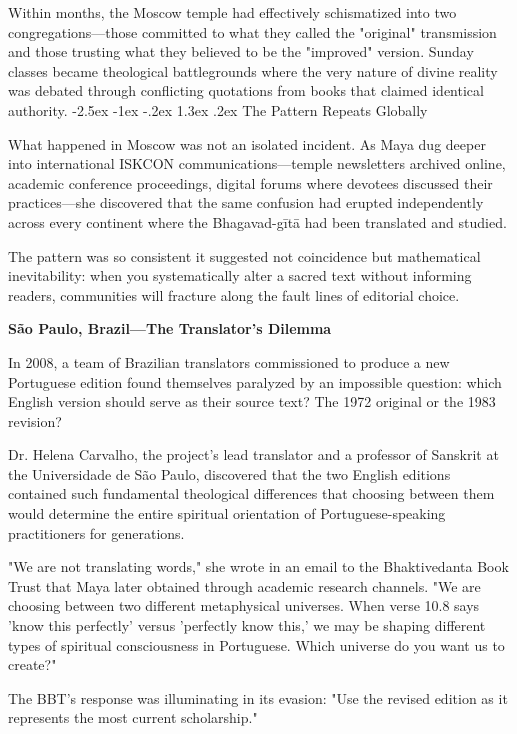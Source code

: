 \documentclass[12pt,twoside]{book}
\makeatletter
\renewcommand\section{\@startsection{section}{1}{\z@}%
{-2.5ex \@plus -1ex \@minus -.2ex}%
{1.3ex \@plus.2ex}%
{\normalfont\Large\bfseries}}
\makeatother
\begin{document}
Within months, the Moscow temple had effectively schismatized into two congregations—those committed to what they called the "original" transmission and those trusting what they believed to be the "improved" version. Sunday classes became theological battlegrounds where the very nature of divine reality was debated through conflicting quotations from books that claimed identical authority.
\section{The Pattern Repeats Globally}
\label{sec:orga15c1b7}

What happened in Moscow was not an isolated incident. As Maya dug deeper into international ISKCON communications—temple newsletters archived online, academic conference proceedings, digital forums where devotees discussed their practices—she discovered that the same confusion had erupted independently across every continent where the Bhagavad-gītā had been translated and studied.

The pattern was so consistent it suggested not coincidence but mathematical inevitability: when you systematically alter a sacred text without informing readers, communities will fracture along the fault lines of editorial choice.

\textbf{\textbf{São Paulo, Brazil—The Translator's Dilemma}}

In 2008, a team of Brazilian translators commissioned to produce a new Portuguese edition found themselves paralyzed by an impossible question: which English version should serve as their source text? The 1972 original or the 1983 revision?

Dr. Helena Carvalho, the project's lead translator and a professor of Sanskrit at the Universidade de São Paulo, discovered that the two English editions contained such fundamental theological differences that choosing between them would determine the entire spiritual orientation of Portuguese-speaking practitioners for generations.

"We are not translating words," she wrote in an email to the Bhaktivedanta Book Trust that Maya later obtained through academic research channels. "We are choosing between two different metaphysical universes. When verse 10.8 says 'know this perfectly' versus 'perfectly know this,' we may be shaping different types of spiritual consciousness in Portuguese. Which universe do you want us to create?"

The BBT's response was illuminating in its evasion: "Use the revised edition as it represents the most current scholarship."
\end{document}
